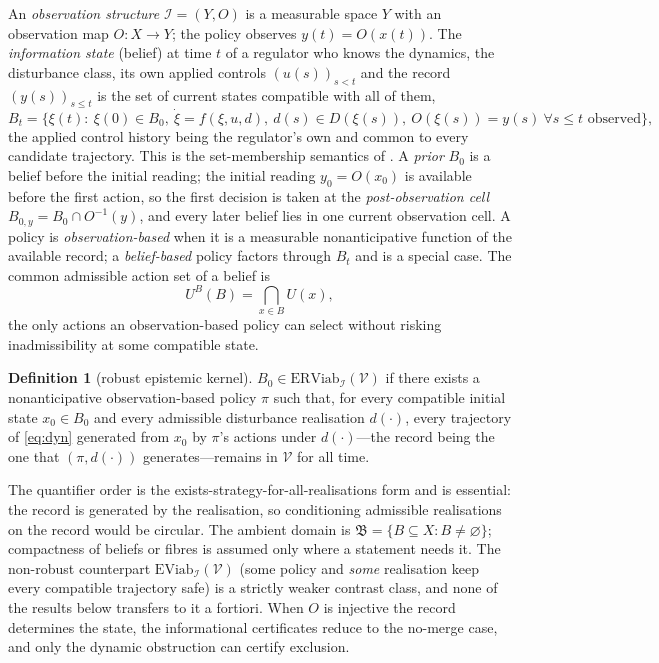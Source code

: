 \documentclass[11pt,a4paper]{article}
\theoremstyle{plain}
\theoremstyle{definition}
\newtheorem{definition}[theorem]{Definition}
\theoremstyle{remark}
\newcommand{\ERViab}{\mathrm{ERViab}}
\newcommand{\EViab}{\mathrm{EViab}}
\newcommand{\cV}{\mathcal{V}}
\newcommand{\cI}{\mathcal{I}}
\begin{document}
An \emph{observation structure} $\cI=(Y,O)$ is a measurable space $Y$ with an observation map $O:X\to Y$; the policy observes $y(t)=O(x(t))$. The \emph{information state} (belief) at time $t$ of a regulator who knows the dynamics, the disturbance class, its own applied controls $(u(s))_{s<t}$ and the record $(y(s))_{s\le t}$ is the set of current states compatible with all of them,
\begin{equation}\label{eq:belief}
B_t=\bigl\{\xi(t):\ \xi(0)\in B_0,\ \dot\xi=f(\xi,u,d),\ d(s)\in D(\xi(s)),\ O(\xi(s))=y(s)\ \forall s\le t\text{ observed}\bigr\},
\end{equation}
the applied control history being the regulator's own and common to every candidate trajectory. This is the set-membership semantics of \citet{kurzhanski1997}. A \emph{prior} $B_0$ is a belief before the initial reading; the initial reading $y_0=O(x_0)$ is available before the first action, so the first decision is taken at the \emph{post-observation cell} $B_{0,y}=B_0\cap O^{-1}(y)$, and every later belief lies in one current observation cell. A policy is \emph{observation-based} when it is a measurable nonanticipative function of the available record; a \emph{belief-based} policy factors through $B_t$ and is a special case. The common admissible action set of a belief is
\[
U^B(B)=\bigcap_{x\in B}U(x),
\]
the only actions an observation-based policy can select without risking inadmissibility at some compatible state.

\begin{definition}[robust epistemic kernel]\label{def:kernel}
$B_0\in\ERViab_\cI(\cV)$ if there exists a nonanticipative observation-based policy $\pi$ such that, for every compatible initial state $x_0\in B_0$ and every admissible disturbance realisation $d(\cdot)$, every trajectory of \eqref{eq:dyn} generated from $x_0$ by $\pi$'s actions under $d(\cdot)$---the record being the one that $(\pi,d(\cdot))$ generates---remains in $\cV$ for all time.
\end{definition}

The quantifier order is the exists-strategy-for-all-realisations form and is essential: the record is generated by the realisation, so conditioning admissible realisations on the record would be circular. The ambient domain is $\mathfrak B=\{B\subseteq X:B\ne\varnothing\}$; compactness of beliefs or fibres is assumed only where a statement needs it. The non-robust counterpart $\EViab_\cI(\cV)$ (some policy and \emph{some} realisation keep every compatible trajectory safe) is a strictly weaker contrast class, and none of the results below transfers to it a fortiori. When $O$ is injective the record determines the state, the informational certificates reduce to the no-merge case, and only the dynamic obstruction can certify exclusion.
\end{document}
